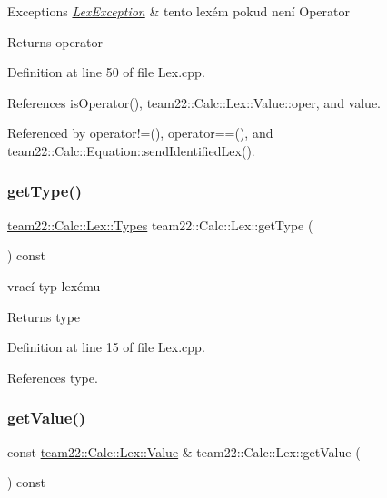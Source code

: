 \begin{DoxyExceptions}{Exceptions}
{\em \hyperlink{classteam22_1_1_calc_1_1_lex_exception}{Lex\+Exception}} & tento lexém pokud není Operator \\
\hline
\end{DoxyExceptions}
\begin{DoxyReturn}{Returns}
operator 
\end{DoxyReturn}


Definition at line 50 of file Lex.\+cpp.



References is\+Operator(), team22\+::\+Calc\+::\+Lex\+::\+Value\+::oper, and value.



Referenced by operator!=(), operator==(), and team22\+::\+Calc\+::\+Equation\+::send\+Identified\+Lex().

\mbox{\label{classteam22_1_1_calc_1_1_lex_ae82ccde78beed14c45df1e747ed21bcb}} 
\subsubsection{\texorpdfstring{get\+Type()}{getType()}}
{\footnotesize\ttfamily \hyperlink{classteam22_1_1_calc_1_1_lex_a295984577c98a23ddd20ee36d33145a2}{team22\+::\+Calc\+::\+Lex\+::\+Types} team22\+::\+Calc\+::\+Lex\+::get\+Type (\begin{DoxyParamCaption}{ }\end{DoxyParamCaption}) const}



vrací typ lexému 

\begin{DoxyReturn}{Returns}
type 
\end{DoxyReturn}


Definition at line 15 of file Lex.\+cpp.



References type.

\mbox{\label{classteam22_1_1_calc_1_1_lex_a8a68cd13a68d32d50d3b014ca4478fab}} 
\subsubsection{\texorpdfstring{get\+Value()}{getValue()}}
{\footnotesize\ttfamily const \hyperlink{unionteam22_1_1_calc_1_1_lex_1_1_value}{team22\+::\+Calc\+::\+Lex\+::\+Value} \& team22\+::\+Calc\+::\+Lex\+::get\+Value (\begin{DoxyParamCaption}{ }\end{DoxyParamCaption}) const}



